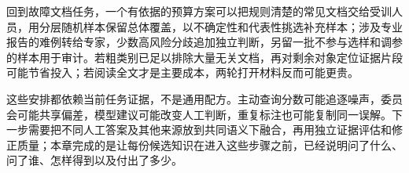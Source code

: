 回到故障文档任务，一个有依据的预算方案可以把规则清楚的常见文档交给受训人员，用分层随机样本保留总体覆盖，以不确定性和代表性挑选补充样本；涉及专业报告的难例转给专家，少数高风险分歧追加独立判断，另留一批不参与选样和调参的样本用于审计。若粗类别已足以排除大量无关文档，再对剩余对象定位证据片段可能节省投入；若阅读全文才是主要成本，两轮打开材料反而可能更贵。

这些安排都依赖当前任务证据，不是通用配方。主动查询分数可能追逐噪声，委员会可能共享偏差，模型建议可能改变人工判断，重复标注也可能复制同一误解。下一步需要把不同人工答案及其他来源放到共同语义下融合，再用独立证据评估和修正质量；本章完成的是让每份候选知识在进入这些步骤之前，已经说明问了什么、问了谁、怎样得到以及付出了多少。
